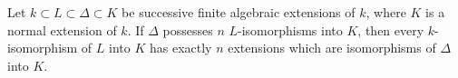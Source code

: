 Let $k \subset L \subset \Delta \subset K$ be successive finite algebraic extensions of $k$, where $K$ is a normal extension of $k$. If $\Delta$ possesses $n$ $L$-isomorphisms into $K$, then every $k$-isomorphism of $L$ into $K$ has exactly $n$ extensions which are isomorphisms of $\Delta$ into $K$.
